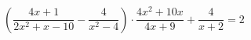 \begin{ex}[type=equation]
	\begin{condition}
		$\left(\dfrac{4x+ 1}{2x^2 + x - 10} - \dfrac{4}{x^2 - 4}\right)\cdot\dfrac{4x^2 + 10x}{4x + 9} + \dfrac{4}{x + 2} = 2$
	\end{condition}
\end{ex}